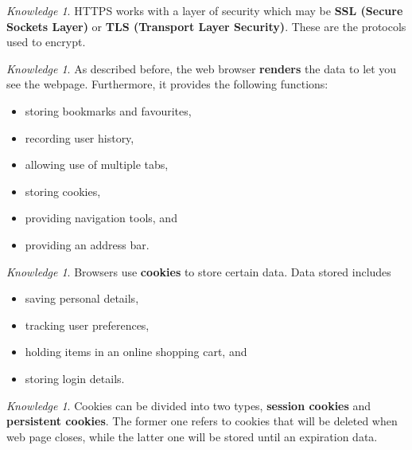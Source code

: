\documentclass[8pt]{article}
\theoremstyle{remark}
\newtheorem{knowledge}[method]{Knowledge}
\begin{document}
            \begin{knowledge}
                HTTPS works with a layer of security which may be \textbf{SSL (Secure Sockets Layer)} or \textbf{TLS (Transport Layer Security)}. These are the protocols used to encrypt.
            \end{knowledge}

            \begin{knowledge}
                As described before, the web browser \textbf{renders} the data to let you see the webpage. Furthermore, it provides the following functions:
                \begin{itemize}
                    \item storing bookmarks and favourites,
                    \item recording user history,
                    \item allowing use of multiple tabs,
                    \item storing cookies,
                    \item providing navigation tools, and
                    \item providing an address bar.
                \end{itemize}
            \end{knowledge}

            \begin{knowledge}
                Browsers use \textbf{cookies} to store certain data. Data stored includes
                \begin{itemize}
                    \item saving personal details,
                    \item tracking user preferences,
                    \item holding items in an online shopping cart, and
                    \item storing login details.
                \end{itemize}
            \end{knowledge}

            \begin{knowledge}
                Cookies can be divided into two types, \textbf{session cookies} and \textbf{persistent cookies}. The former one refers to cookies that will be deleted when web page closes, while the latter one will be stored until an expiration data.
            \end{knowledge}
\end{document}
